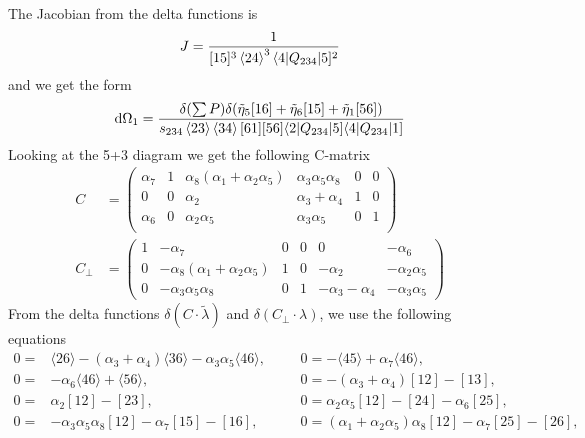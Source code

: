 \documentclass[letter,11pt]{article}
\newcommand{\aMs}[3]{\langle #1|#2|#3]}  		%
\begin{document}
The Jacobian from the delta functions is
\begin{equation}
	\begin{aligned}
		J=\frac{1}{[15]^3\expval{24}^3\aMs{4}{Q_{234}}{5}^2}
	\end{aligned}
\end{equation}
and we get the form
\begin{equation}
	\begin{aligned}
		\dd \Omega_1=\frac{\delta(\sum P)\delta(\tilde\eta_5[16]+\tilde\eta_6[15]+\tilde\eta_1[56])}{s_{234}\expval{23}\expval{34}[61][56]\aMs{2}{Q_{234}}{5}\aMs{4}{Q_{234}}{1}}
	\end{aligned}
\end{equation}
Looking at the 5+3 diagram we get the following C-matrix
\begin{equation}
	\begin{aligned}
		C&=\left(
		\begin{array}{cccccc}
		\alpha_7 &1& \alpha_8(\alpha_1+\alpha_2\alpha_5)&\alpha_3\alpha_5\alpha_8& 0& 0 \\
		0 &0&\alpha_2 & \alpha_3+\alpha_4 & 1 & 0 \\
		\alpha_6 & 0& \alpha_2\alpha_5& \alpha_3\alpha_5 &0 & 1 \\
		\end{array}
		\right)\\
		C_\perp&=
		\left(
		\begin{array}{cccccc}
		1 & -\alpha_7 & 0 & 0 & 0& -\alpha_6  \\
		0 & -\alpha_8(\alpha_1+\alpha_2\alpha_5) & 1 &0 & -\alpha_2 & -\alpha_2\alpha_5 \\
		0 & -\alpha_3\alpha_5\alpha_8 & 0 &1 &-\alpha_3-\alpha_4 &-\alpha_3\alpha_5 
		\end{array}
		\right)
	\end{aligned}
\end{equation}
From the delta functions $\delta(C\cdot \tilde \lambda)$ and $\delta(C_\perp \cdot \lambda)$, we use the following equations
\begin{equation}
	\begin{aligned}
		0=&\langle 2 6 \rangle - (\alpha_{3} + \alpha_{4}) \langle 3 6 \rangle - \alpha_{3} \alpha_{5} \langle 4 6 \rangle,~~~~
		&&0=-\langle 4 5 \rangle + \alpha_{7} \langle 4 6 \rangle,\\
	0=&	-\alpha_{6} \langle 4 6 \rangle + \langle 5 6 \rangle
	,~~~~
	&&0=	-(\alpha_{3} + \alpha_{4}) \left[ 1 2 \right] - \left[ 1 3 \right],
		\\
	0=&	\alpha_{2} \left[ 1 2 \right] - \left[ 2 3 \right],~~~~
	&&0=	\alpha_{2} \alpha_{5} \left[ 1 2 \right] - \left[ 2 4 \right] - \alpha_{6} \left[ 2 5 \right],
		\\
	0=&	-\alpha_{3} \alpha_{5} \alpha_{8} \left[ 1 2 \right] - \alpha_{7} \left[ 1 5 \right] - \left[ 1 6 \right],~~~~
	&&0=	(\alpha_{1} + \alpha_{2} \alpha_{5}) \alpha_{8} \left[ 1 2 \right] - \alpha_{7} \left[ 2 5 \right] - \left[ 2 6 \right],
	\end{aligned}
\end{equation}
\end{document}
